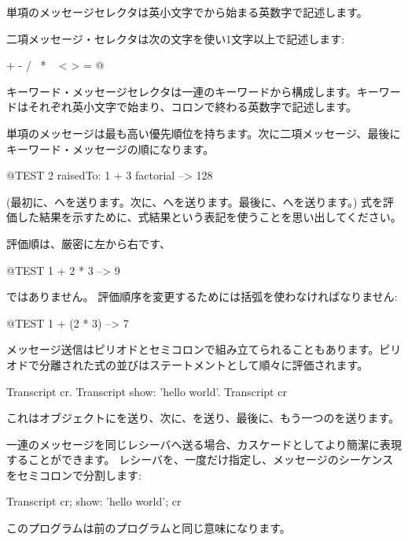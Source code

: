 \documentclass[a4paper,10pt,twoside]{book}
\begin{document}
単項のメッセージセレクタは英小文字でから始まる英数字で記述します。

二項メッセージ・セレクタは次の文字を使い1文字以上で記述します:
\begin{code}{}
+ - / \ * ~ < > = @ %
\end{code}
\noindent
キーワード・メッセージセレクタは一連のキーワードから構成します。キーワードはそれぞれ英小文字で始まり、コロンで終わる英数字で記述します。

単項のメッセージは最も高い優先順位を持ちます。次に二項メッセージ、最後にキーワード・メッセージの順になります。
\begin{code}{@TEST}
2 raisedTo: 1 + 3 factorial --> 128
\end{code}
(最初に、へを送ります。次に、へを送ります。最後に、へを送ります。)
式を評価した結果を示すために、式\ct{-->}結果という表記を使うことを思い出してください。

評価順は、厳密に左から右です、
\begin{code}{@TEST}
1 + 2 * 3 --> 9
\end{code}
ではありません。
評価順序を変更するためには括弧を使わなければなりません:
\begin{code}{@TEST}
1 + (2 * 3) --> 7
\end{code}

メッセージ送信はピリオドとセミコロンで組み立てられることもあります。ピリオドで分離された式の並びはステートメントとして順々に評価されます。

\begin{code}{}
Transcript cr.
Transcript show: 'hello world'.
Transcript cr
\end{code}

\noindent
これはオブジェクトにを送り、次に、を送り、最後に、もう一つのを送ります。

一連のメッセージを同じレシーバへ送る場合、カスケードとしてより簡潔に表現することができます。
レシーバを、一度だけ指定し、メッセージのシーケンスをセミコロンで分割します:

\begin{code}{}
Transcript cr;
    show: 'hello world';
    cr
\end{code}
このプログラムは前のプログラムと同じ意味になります。
\end{document}
